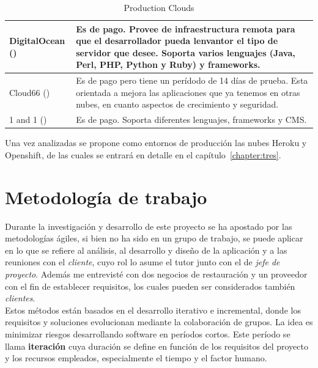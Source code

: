 \begin{table}[H]
\begin{tabular}{p{2cm} p{8cm}}
	\hline
	DigitalOcean (\cite{URL:DigitalOcean}) & Es de pago. Provee de infraestructura remota para que el desarrollador pueda lenvantor el tipo de servidor que desee. Soporta varios lenguajes (Java, Perl, PHP, Python y Ruby) y frameworks. \\
	\hline
	Cloud66 (\cite{URL:Cloud66}) & Es de pago pero tiene un perídodo de 14 días de prueba. Esta orientada a mejora las aplicaciones que ya tenemos en otras nubes, en cuanto aspectos de crecimiento y seguridad. \\
	\hline
	1 and 1 (\cite{URL:1_and_1}) & Es de pago. Soporta diferentes lenguajes, frameworks y CMS. \\
	\hline
	\end{tabular}
	\caption{Production Clouds}
	\label{tabla:clouds}
\end{table}

Una vez analizadas se propone como entornos de producción las nubes Heroku y Openshift, de las cuales se entrará en detalle en el capítulo~\ref{chapter:tres}.


\vspace*{0.2in}
\section{Metodología de trabajo}\label{cap.1.3}

Durante la investigación y desarrollo de este proyecto se ha apostado por las metodologías ágiles, si bien no ha sido en un grupo de trabajo, se puede aplicar en lo que se refiere al análisis, al desarrollo y diseño de la aplicación y a las reuniones con el \emph{cliente}, cuyo rol lo asume el tutor junto con el de \emph{jefe de proyecto}. Además me entrevisté con dos negocios de restauración y un proveedor con el fin de establecer requisitos, los cuales pueden ser considerados también \emph{clientes}. \\

Estos métodos están basados en el desarrollo iterativo e incremental, donde los requisitos y soluciones evolucionan mediante la colaboración de grupos. La idea es minimizar riesgos desarrollando software en períodos cortos. Este período se llama \textbf{iteración} cuya duración se define en función de los requisitos del proyecto y los recursos empleados, especialmente el tiempo y el factor humano. \\

